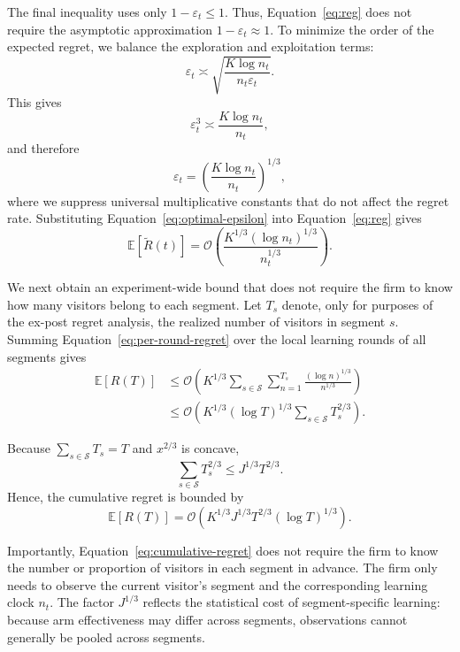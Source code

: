 \documentclass[mksc,nonblindrev]{informs3}
\begin{document}
\begin{APPENDICES}
The final inequality uses only $1-\varepsilon_t\leq1$. Thus, Equation~\eqref{eq:reg} does not require the asymptotic approximation $1-\varepsilon_t\approx1$. To minimize the order of the expected regret, we balance the exploration and exploitation terms:
\begin{equation}
\varepsilon_t
\asymp
\sqrt{
\frac{K\log n_t}
{n_t\varepsilon_t}
}.
\end{equation}
This gives
\begin{equation}
\varepsilon_t^3
\asymp
\frac{K\log n_t}{n_t},
\end{equation}
and therefore
\begin{equation}
\label{eq:optimal-epsilon}
\varepsilon_t
=
\left(
\frac{K\log n_t}{n_t}
\right)^{1/3},
\end{equation}
where we suppress universal multiplicative constants that do not affect the regret rate. Substituting Equation~\eqref{eq:optimal-epsilon} into Equation~\eqref{eq:reg} gives
\begin{equation}
\label{eq:per-round-regret}
\mathbb E[\widetilde R(t)]
=
\mathcal O\left(
\frac{
K^{1/3}(\log n_t)^{1/3}
}{
n_t^{1/3}
}
\right).
\end{equation}

We next obtain an experiment-wide bound that does not require the firm to know how many visitors belong to each segment. Let $T_s$ denote, only for purposes of the ex-post regret analysis, the realized number of visitors in segment $s$. Summing Equation~\eqref{eq:per-round-regret} over the local learning rounds of all segments gives
\begin{align}
\mathbb E[R(T)]
&\leq
\mathcal O\left(
K^{1/3}
\sum_{s\in\mathcal S}
\sum_{n=1}^{T_s}
\frac{(\log n)^{1/3}}{n^{1/3}}
\right)
\nonumber\\
&\leq
\mathcal O\left(
K^{1/3}
(\log T)^{1/3}
\sum_{s\in\mathcal S}
T_s^{2/3}
\right).
\end{align}

Because $\sum_{s\in\mathcal S}T_s=T$ and $x^{2/3}$ is concave,
\begin{equation}
\sum_{s\in\mathcal S}T_s^{2/3}
\leq
J^{1/3}T^{2/3}.
\end{equation}
Hence, the cumulative regret is bounded by
\begin{equation}
\label{eq:cumulative-regret}
\mathbb E[R(T)]
=
\mathcal O\left(
K^{1/3}
J^{1/3}
T^{2/3}
(\log T)^{1/3}
\right).
\end{equation}

Importantly, Equation~\eqref{eq:cumulative-regret} does not require the firm to know the number or proportion of visitors in each segment in advance. The firm only needs to observe the current visitor's segment and the corresponding learning clock $n_t$. The factor $J^{1/3}$ reflects the statistical cost of segment-specific learning: because arm effectiveness may differ across segments, observations cannot generally be pooled across segments.


\end{APPENDICES}
\end{document}
